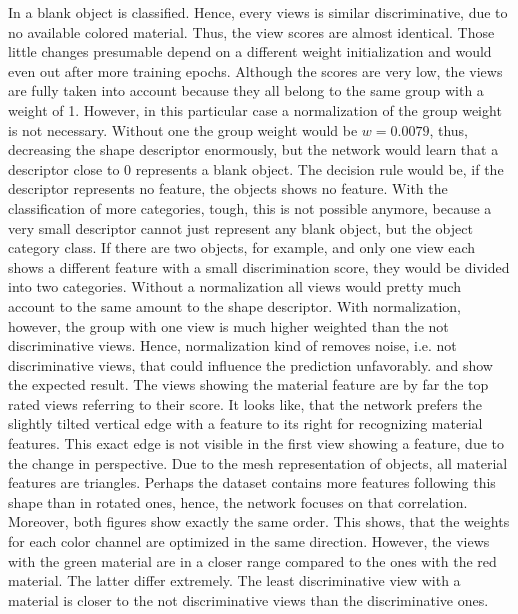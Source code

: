 In  a blank object is classified.
Hence, every views is similar discriminative, due to no available colored material.
Thus, the view scores are almost identical.
Those little changes presumable depend on a different weight initialization and would even out after more training epochs.
Although the scores are very low, the views are fully taken into account because they all belong to the same group with a weight of 1.
However, in this particular case a normalization of the group weight is not necessary.
Without one the group weight would be $w = 0.0079$, thus, decreasing the shape descriptor enormously, but the network would learn that a descriptor close to 0 represents a blank object.
The decision rule would be, if the descriptor represents no feature, the objects shows no feature.
With the classification of more categories, tough, this is not possible anymore, because a very small descriptor cannot just represent any blank object, but the object category class.
If there are two objects, for example, and only one view each shows a different feature with a small discrimination score, they would be divided into two categories.
Without a normalization all views would pretty much account to the same amount to the shape descriptor.
With normalization, however, the group with one view is much higher weighted than the not discriminative views.
Hence, normalization kind of removes noise, i.e. not discriminative views, that could influence the prediction unfavorably.
 and  show the expected result.
The views showing the material feature are by far the top rated views referring to their score.
It looks like, that the network prefers the slightly tilted vertical edge with a feature to its right for recognizing material features.
This exact edge is not visible in the first view showing a feature, due to the change in perspective.
Due to the mesh representation of objects, all material features are triangles.
Perhaps the dataset contains more features following this shape than in rotated ones, hence, the network focuses on that correlation.
Moreover, both figures show exactly the same order.
This shows, that the weights for each color channel are optimized in the same direction.
However, the views with the green material are in a closer range compared to the ones with the red material.
The latter differ extremely.
The least discriminative view with a material is closer to the not discriminative views than the discriminative ones.

